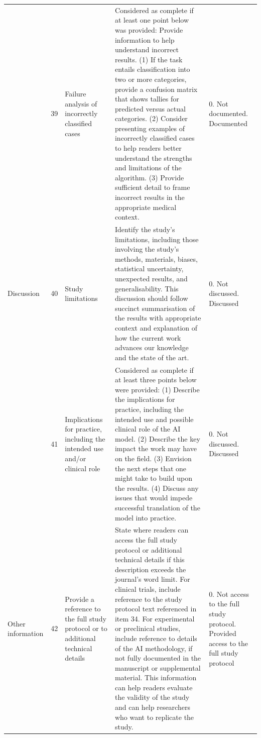 \begin{landscape}
\begin{longtable}{@{}p{1.7cm}p{0.7cm}p{3.6cm}p{9.6cm}p{3.2cm}@{}}
	\addlinespace
	& 39 & Failure analysis of incorrectly classified cases & Considered as complete if at least one point below was provided: Provide information to help understand incorrect results. (1) If the task entails classification into two or more categories, provide a confusion matrix that shows tallies for predicted versus actual categories. (2) Consider presenting examples of incorrectly classified cases to help readers better understand the strengths and limitations of the algorithm. (3) Provide sufficient detail to frame incorrect results in the appropriate medical context. & 0. Not documented\newline 1. Documented \\
	\addlinespace
	Discussion & 40 & Study limitations & Identify the study's limitations, including those involving the study's methods, materials, biases, statistical uncertainty, unexpected results, and generalisability. This discussion should follow succinct summarisation of the results with appropriate context and explanation of how the current work advances our knowledge and the state of the art. & 0. Not discussed\newline 1. Discussed \\
	\addlinespace
	& 41 & Implications for practice, including the intended use and/or clinical role & Considered as complete if at least three points below were provided: (1) Describe the implications for practice, including the intended use and possible clinical role of the AI model. (2) Describe the key impact the work may have on the field. (3) Envision the next steps that one might take to build upon the results. (4) Discuss any issues that would impede successful translation of the model into practice. & 0. Not discussed\newline 1. Discussed \\
	\addlinespace
	Other information & 42 & Provide a reference to the full study protocol or to additional technical details & State where readers can access the full study protocol or additional technical details if this description exceeds the journal's word limit. For clinical trials, include reference to the study protocol text referenced in item 34. For experimental or preclinical studies, include reference to details of the AI methodology, if not fully documented in the manuscript or supplemental material. This information can help readers evaluate the validity of the study and can help researchers who want to replicate the study. & 0. Not access to the full study protocol\newline 1. Provided access to the full study protocol \\

\end{longtable}
\end{landscape}
